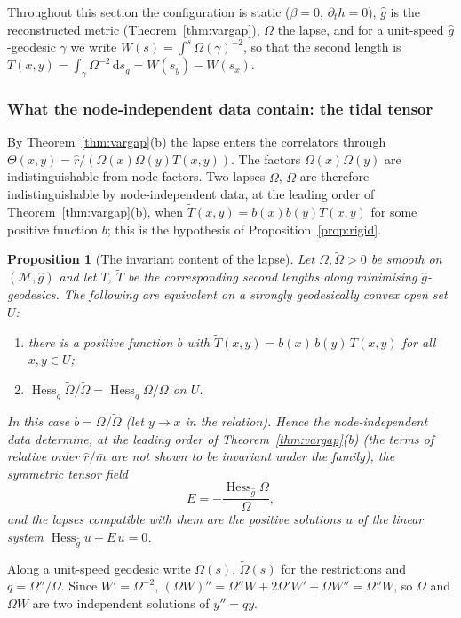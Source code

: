 \documentclass[11pt,a4paper]{article}
\makeatletter
\theoremstyle{stmt}
\newtheorem{proposition}[theorem]{Proposition}
\theoremstyle{defn}
\theoremstyle{rmk}
\renewenvironment{proof}[1][\proofname]{\par\pushQED{\qed}\normalfont\topsep6\p@\@plus6\p@\relax
  \trivlist\item[\hskip\labelsep{\sffamily\itshape\small #1.}]\ignorespaces}{\popQED\endtrivlist\@endpefalse}
\numberwithin{equation}{section}
\newcommand{\M}{\mathcal{M}}
\newcommand{\dd}{\mathrm{d}}
\makeatother
\begin{document}
{Throughout this section the configuration is static ($\beta=0$, $\partial_th=0$), $\hat g$ is the reconstructed metric (Theorem~\ref{thm:vargap}), $\Omega$ the lapse, and for a unit-speed $\hat g$-geodesic $\gamma$ we write $W(s)=\int^s\Omega(\gamma)^{-2}$, so that the second length is $T(x,y)=\int_\gamma\Omega^{-2}\,\dd s_{\hat g}=W(s_y)-W(s_x)$.

\subsubsection{What the node-independent data contain: the tidal tensor}

By Theorem~\ref{thm:vargap}(b) the lapse enters the correlators through $\Theta(x,y)=\hat r/(\Omega(x)\Omega(y)T(x,y))$. The factors $\Omega(x)\Omega(y)$ are indistinguishable from node factors. Two lapses $\Omega$, $\tilde\Omega$ are therefore indistinguishable by node-independent data, at the leading order of Theorem~\ref{thm:vargap}(b), when $\tilde T(x,y)=b(x)b(y)T(x,y)$ for some positive function $b$; this is the hypothesis of Proposition~\ref{prop:rigid}.

\begin{proposition}[The invariant content of the lapse]\label{prop:tidal}
Let $\Omega,\tilde\Omega>0$ be smooth on $(\M,\hat g)$ and let $T$, $\tilde T$ be the corresponding second lengths along minimising $\hat g$-geodesics. The following are equivalent on a strongly geodesically convex open set $U$:
\begin{enumerate}[label=\textup{(\roman*)}]
\item there is a positive function $b$ with $\tilde T(x,y)=b(x)\,b(y)\,T(x,y)$ for all $x,y\in U$;
\item $\operatorname{Hess}_{\hat g}\tilde\Omega/\tilde\Omega=\operatorname{Hess}_{\hat g}\Omega/\Omega$ on $U$.
\end{enumerate}
In this case $b=\Omega/\tilde\Omega$ (let $y\to x$ in the relation). Hence the node-independent data determine, at the leading order of Theorem~\ref{thm:vargap}(b) (the terms of relative order $\hat r/\bar m$ are not shown to be invariant under the family), the symmetric tensor field
\[
E=-\frac{\operatorname{Hess}_{\hat g}\Omega}{\Omega},
\]
and the lapses compatible with them are the positive solutions $u$ of the linear system $\operatorname{Hess}_{\hat g}u+E\,u=0$.
\end{proposition}

\begin{proof}
Along a unit-speed geodesic write $\Omega(s)$, $\tilde\Omega(s)$ for the restrictions and $q=\Omega''/\Omega$. Since $W'=\Omega^{-2}$, $(\Omega W)''=\Omega''W+2\Omega'W'+\Omega W''=\Omega''W$, so $\Omega$ and $\Omega W$ are two independent solutions of $y''=qy$.


\end{proof}}
\end{document}
